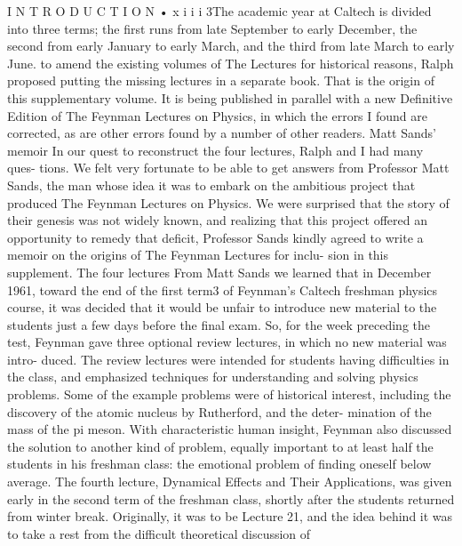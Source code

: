 \documentclass[11pt,oneside]{article}
\begin{document}
I N T R O D U C T I O N • x i i i 3The academic year at Caltech is divided into three terms; the first runs from late September to early December, the second from early January to early March, and the third from late March to early June. to amend the existing volumes of The Lectures for historical reasons, Ralph proposed putting the missing lectures in a separate book. That is the origin of this supplementary volume. It is being published in parallel with a new Definitive Edition of The Feynman Lectures on Physics, in which the errors I found are corrected, as are other errors found by a number of other readers. Matt Sands’ memoir In our quest to reconstruct the four lectures, Ralph and I had many ques- tions. We felt very fortunate to be able to get answers from Professor Matt Sands, the man whose idea it was to embark on the ambitious project that produced The Feynman Lectures on Physics. We were surprised that the story of their genesis was not widely known, and realizing that this project offered an opportunity to remedy that deficit, Professor Sands kindly agreed to write a memoir on the origins of The Feynman Lectures for inclu- sion in this supplement. The four lectures From Matt Sands we learned that in December 1961, toward the end of the first term3 of Feynman’s Caltech freshman physics course, it was decided that it would be unfair to introduce new material to the students just a few days before the final exam. So, for the week preceding the test, Feynman gave three optional review lectures, in which no new material was intro- duced. The review lectures were intended for students having difficulties in the class, and emphasized techniques for understanding and solving physics problems. Some of the example problems were of historical interest, including the discovery of the atomic nucleus by Rutherford, and the deter- mination of the mass of the pi meson. With characteristic human insight, Feynman also discussed the solution to another kind of problem, equally important to at least half the students in his freshman class: the emotional problem of finding oneself below average. The fourth lecture, Dynamical Effects and Their Applications, was given early in the second term of the freshman class, shortly after the students returned from winter break. Originally, it was to be Lecture 21, and the idea behind it was to take a rest from the difficult theoretical discussion of\par
\end{document}

